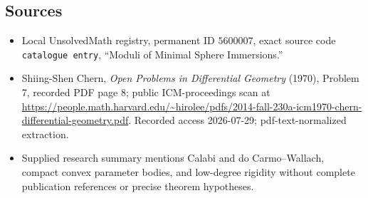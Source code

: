 \documentclass[11pt]{article}
\begin{document}
\subsection{Sources}
\begin{itemize}
\item Local UnsolvedMath registry, permanent ID \(5600007\), exact source code \texttt{catalogue entry}, ``Moduli of Minimal Sphere Immersions.''
\item Shiing-Shen Chern, \emph{Open Problems in Differential Geometry} (1970), Problem 7, recorded PDF page 8; public ICM-proceedings scan at \url{https://people.math.harvard.edu/~hirolee/pdfs/2014-fall-230a-icm1970-chern-differential-geometry.pdf}. Recorded access 2026-07-29; pdf-text-normalized extraction.
\item Supplied research summary mentions Calabi and do Carmo--Wallach, compact convex parameter bodies, and low-degree rigidity without complete publication references or precise theorem hypotheses.
\end{itemize}
\end{document}
